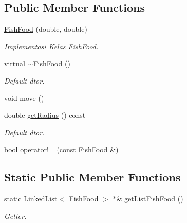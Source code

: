 \subsection*{Public Member Functions}
\begin{DoxyCompactItemize}
\item 
\mbox{\hyperlink{class_fish_food_a3e2ae5b4b6c889595605f66bb9974b98}{Fish\+Food}} (double, double)
\begin{DoxyCompactList}\small\item\em Implementasi Kelas \mbox{\hyperlink{class_fish_food}{Fish\+Food}}. \end{DoxyCompactList}\item 
\mbox{\label{class_fish_food_aeb0af173d92cc5c4b93ee1cdd6087c37}} 
virtual \mbox{\hyperlink{class_fish_food_aeb0af173d92cc5c4b93ee1cdd6087c37}{$\sim$\+Fish\+Food}} ()
\begin{DoxyCompactList}\small\item\em Default dtor. \end{DoxyCompactList}\item 
void \mbox{\hyperlink{class_fish_food_a411070d0e4f5c964ff34ca17fca0ec05}{move}} ()
\item 
\mbox{\label{class_fish_food_a3372273ff7ef310359eb1a4146fd4ee7}} 
double \mbox{\hyperlink{class_fish_food_a3372273ff7ef310359eb1a4146fd4ee7}{get\+Radius}} () const
\begin{DoxyCompactList}\small\item\em Default dtor. \end{DoxyCompactList}\item 
bool \mbox{\hyperlink{class_fish_food_a3df73ecdd9d67d9a29f352e48ed74123}{operator!=}} (const \mbox{\hyperlink{class_fish_food}{Fish\+Food}} \&)
\end{DoxyCompactItemize}
\subsection*{Static Public Member Functions}
\begin{DoxyCompactItemize}
\item 
\mbox{\label{class_fish_food_a75406da59c7dc6e441b389717c966567}} 
static \mbox{\hyperlink{class_linked_list}{Linked\+List}}$<$ \mbox{\hyperlink{class_fish_food}{Fish\+Food}} $>$ $\ast$\& \mbox{\hyperlink{class_fish_food_a75406da59c7dc6e441b389717c966567}{get\+List\+Fish\+Food}} ()
\begin{DoxyCompactList}\small\item\em Getter. \end{DoxyCompactList}\end{DoxyCompactItemize}


